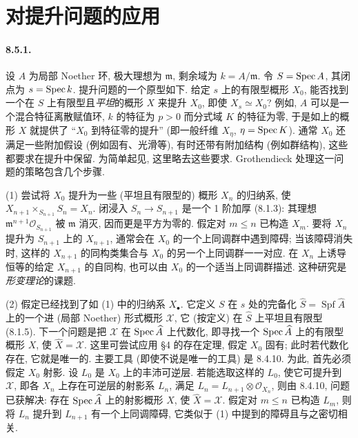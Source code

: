 \section{对提升问题的应用}\label{ch08:sec85}
\paragraph{8.5.1.}
设 $A$ 为局部 Noether 环, 极大理想为 $\mathfrak m$, 剩余域为 $k=A/\mathfrak m$. 令 $S=\operatorname{Spec} A$, 其闭点为 $s=\operatorname{Spec} k$. 提升问题的一个原型如下.
给定 $s$ 上的有限型概形 $X_0$, 能否找到一个在 $S$ 上有限型且\emph{平坦}的概形 $X$ 来提升 $X_0$, 即使 $X_s\simeq X_0$? 例如, $A$ 可以是一个混合特征离散赋值环, $k$ 的特征为 $p>0$ 而分式域 $K$ 的特征为零, 于是如上的概形 $X$ 就提供了 ``$X_0$ 到特征零的提升'' (即一般纤维 $X_\eta$, $\eta=\operatorname{Spec} K$). 通常 $X_0$ 还满足一些附加假设 (例如固有、光滑等), 有时还带有附加结构 (例如群结构), 这些都要求在提升中保留. 为简单起见, 这里略去这些要求. Grothendieck 处理这一问题的策略包含几个步骤.

(1) 尝试将 $X_0$ 提升为一些 (平坦且有限型的) 概形 $X_n$ 的归纳系, 使 $X_{n+1}\times_{S_{n+1}}S_n=X_n$. 闭浸入 $S_n\to S_{n+1}$ 是一个 1 阶加厚 (8.1.3): 其理想 $\mathfrak m^{n+1}\mathcal O_{S_{n+1}}$ 被 $\mathfrak m$ 消灭, 因而更是平方为零的. 假定对 $m\leq n$ 已构造 $X_m$. 要将 $X_n$ 提升为 $S_{n+1}$ 上的 $X_{n+1}$, 通常会在 $X_0$ 的一个上同调群中遇到障碍; 当该障碍消失时, 这样的 $X_{n+1}$ 的同构类集合与 $X_0$ 的另一个上同调群一一对应. 在 $X_n$ 上诱导恒等的给定 $X_{n+1}$ 的自同构, 也可以由 $X_0$ 的一个适当上同调群描述. 这种研究是\emph{形变理论}的课题.

(2) 假定已经找到了如 (1) 中的归纳系 $X_\bullet$. 它定义 $S$ 在 $s$ 处的完备化 $\widehat S=\operatorname{Spf}\widehat A$ 上的一个进 (局部 Noether) 形式概形 $\mathcal X$, 它 (按定义) 在 $\widehat S$ 上平坦且有限型 (8.1.5). 下一个问题是把 $\mathcal X$ 在 $\operatorname{Spec}\widehat A$ 上代数化, 即寻找一个 $\operatorname{Spec}\widehat A$ 上的有限型概形 $X$, 使 $\widehat X=\mathcal X$. 这里可尝试应用 §4 的存在定理, 假定 $X_0$ 固有; 此时若代数化存在, 它就是唯一的. 主要工具 (即使不说是唯一的工具) 是 8.4.10. 为此, 首先必须假定 $X_0$ 射影. 设 $L_0$ 是 $X_0$ 上的丰沛可逆层. 若能选取这样的 $L_0$, 使它可提升到 $\mathcal X$, 即各 $X_n$ 上存在可逆层的射影系 $L_n$, 满足 $L_n=L_{n+1}\otimes\mathcal O_{X_n}$, 则由 8.4.10, 问题已获解决: 存在 $\operatorname{Spec}\widehat A$ 上的射影概形 $X$, 使 $\widehat X=\mathcal X$. 假定对 $m\leq n$ 已构造 $L_m$, 则将 $L_n$ 提升到 $L_{n+1}$ 有一个上同调障碍, 它类似于 (1) 中提到的障碍且与之密切相关.


